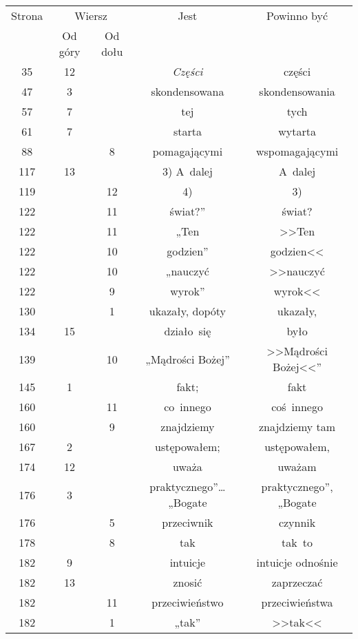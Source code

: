 \documentclass[a4paper,11pt]{article}
\begin{document}
\begin{center}

  \begin{tabular}{|c|c|c|c|c|}
    \hline
    Strona & \multicolumn{2}{c|}{Wiersz} & Jest
                              & Powinno być \\ \cline{2-3}
    & Od góry & Od dołu & & \\
    \hline
    35  & 12 & & \textit{Części} & części \\
    47  &  3 & & skondensowana & skondensowania \\
    57  &  7 & & tej & tych \\
    61  &  7 & & starta & wytarta \\
    88  & &  8 & pomagającymi & wspomagającymi \\
    117 & 13 & & 3) A~dalej & A~dalej \\
    119 & & 12 & 4) & 3) \\
    122 & & 11 & świat?” & świat? \\
    122 & & 11 & „Ten & >>Ten \\
    122 & & 10 & godzien” & godzien<<  %
    \\
    122 & & 10 & „nauczyć & >>nauczyć \\
    122 & &  9 & wyrok” & wyrok<<  %
    \\
    130 & &  1 & ukazały, dopóty & ukazały, \\
    134 & 15 & & działo~się & było \\
    139 & & 10 & „Mądrości Bożej” & >>Mądrości Bożej<<”  %
    \\
    145 &  1 & & fakt; & fakt \\
    160 & & 11 & co~innego & coś~innego \\
    160 & &  9 & znajdziemy & znajdziemy tam \\
    167 &  2 & & ustępowałem; & ustępowałem, \\
    174 & 12 & & uważa & uważam \\
    176 &  3 & & praktycznego”\ldots „Bogate & praktycznego”, „Bogate \\
    176 & &  5 & przeciwnik & czynnik \\
    178 & &  8 & tak & tak~to \\
    182 &  9 & & intuicje & intuicje odnośnie \\
    182 & 13 & & znosić & zaprzeczać \\
    182 & & 11 & przeciwieństwo & przeciwieństwa \\
    182 & &  1 & „tak” & >>tak<<  %

\end{tabular}
\end{center}
\end{document}
